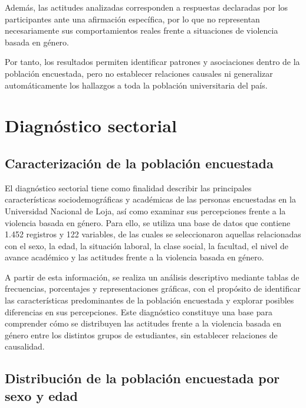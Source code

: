 \documentclass[
  spanish,
  11pt,
  letterpaper,
  DIV=11,
  numbers=noendperiod]{scrreprt}
\begin{document}
Además, las actitudes analizadas corresponden a respuestas declaradas
por los participantes ante una afirmación específica, por lo que no
representan necesariamente sus comportamientos reales frente a
situaciones de violencia basada en género.

Por tanto, los resultados permiten identificar patrones y asociaciones
dentro de la población encuestada, pero no establecer relaciones
causales ni generalizar automáticamente los hallazgos a toda la
población universitaria del país.


\chapter{Diagnóstico sectorial}\label{diagnuxf3stico-sectorial}

\section{Caracterización de la población
encuestada}\label{caracterizaciuxf3n-de-la-poblaciuxf3n-encuestada}

El diagnóstico sectorial tiene como finalidad describir las principales
características sociodemográficas y académicas de las personas
encuestadas en la Universidad Nacional de Loja, así como examinar sus
percepciones frente a la violencia basada en género. Para ello, se
utiliza una base de datos que contiene 1.452 registros y 122 variables,
de las cuales se seleccionaron aquellas relacionadas con el sexo, la
edad, la situación laboral, la clase social, la facultad, el nivel de
avance académico y las actitudes frente a la violencia basada en género.

A partir de esta información, se realiza un análisis descriptivo
mediante tablas de frecuencias, porcentajes y representaciones gráficas,
con el propósito de identificar las características predominantes de la
población encuestada y explorar posibles diferencias en sus
percepciones. Este diagnóstico constituye una base para comprender cómo
se distribuyen las actitudes frente a la violencia basada en género
entre los distintos grupos de estudiantes, sin establecer relaciones de
causalidad.

\section{Distribución de la población encuestada por sexo y
edad}\label{distribuciuxf3n-de-la-poblaciuxf3n-encuestada-por-sexo-y-edad}
\end{document}
